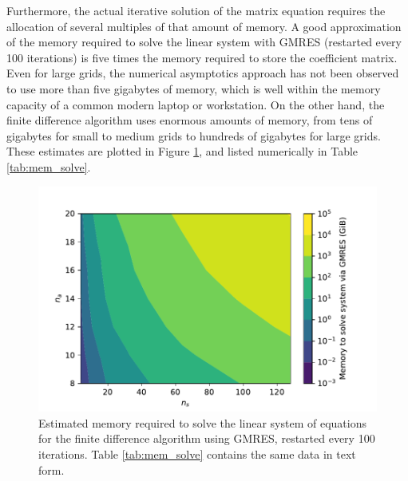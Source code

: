 \documentclass[ms,cpyr,lof,lot]{uathesis}
\providecommand{\DIFaddbeginFL}{} %
\providecommand{\DIFaddendFL}{} %
\providecommand{\DIFdelbeginFL}{} %
\providecommand{\DIFdelendFL}{} %
\newcommand{\DIFscaledelfig}{0.5}
\newlength{\DIFdelgraphicswidth} %
\newlength{\DIFdelgraphicsheight} %
\newcommand{\DIFaddincludegraphics}[2][]{{\color{blue}\fbox{\DIFOincludegraphics[#1]{#2}}}} %
\newcommand{\DIFdelincludegraphics}[2][]{%
\sbox{\DIFdelgraphicsbox}{\DIFOincludegraphics[#1]{#2}}%
\settoboxwidth{\DIFdelgraphicswidth}{\DIFdelgraphicsbox} %
\settoboxtotalheight{\DIFdelgraphicsheight}{\DIFdelgraphicsbox} %
\scalebox{\DIFscaledelfig}{%
\parbox[b]{\DIFdelgraphicswidth}{\usebox{\DIFdelgraphicsbox}\\[-\baselineskip] \rule{\DIFdelgraphicswidth}{0em}}\llap{\resizebox{\DIFdelgraphicswidth}{\DIFdelgraphicsheight}{%
\setlength{\unitlength}{\DIFdelgraphicswidth}%
\begin{picture}(1,1)%
\thicklines\linethickness{2pt} %
{\color[rgb]{1,0,0}\put(0,0){\framebox(1,1){}}}%
{\color[rgb]{1,0,0}\put(0,0){\line( 1,1){1}}}%
{\color[rgb]{1,0,0}\put(0,1){\line(1,-1){1}}}%
\end{picture}%
}\hspace*{3pt}}} %
} %
\DeclareRobustCommand{\DIFaddbeginFL}{\DIFOaddbeginFL \let\includegraphics\DIFaddincludegraphics} %
\DeclareRobustCommand{\DIFaddendFL}{\DIFOaddendFL \let\includegraphics\DIFOincludegraphics} %
\DeclareRobustCommand{\DIFdelbeginFL}{\DIFOdelbeginFL \let\includegraphics\DIFdelincludegraphics} %
\DeclareRobustCommand{\DIFdelendFL}{\DIFOaddendFL \let\includegraphics\DIFOincludegraphics} %
\begin{document}
Furthermore, the actual iterative solution of the matrix equation requires the allocation of several multiples of that amount of memory.
A good approximation of the memory required to solve the linear system with GMRES (restarted every 100 iterations) is five times the memory required to store the coefficient matrix.
Even for large grids, the numerical asymptotics approach has not been observed to use more than five gigabytes of memory, which is well within the memory capacity of a common modern laptop or workstation.
On the other hand, the finite difference algorithm uses enormous amounts of memory, from tens of gigabytes for small to medium grids to hundreds of gigabytes for large grids.
These estimates are plotted in Figure \ref{fig:mem_solve}, and listed numerically in Table \ref{tab:mem_solve}.
\begin{figure}[H]
  \centering
  \DIFdelbeginFL %
\DIFdelendFL \DIFaddbeginFL \includegraphics[width=6in]{memory_solve}
  \DIFaddendFL \caption{Estimated memory required to solve the linear system of equations for the finite difference algorithm using GMRES, restarted every 100 iterations. Table \ref{tab:mem_solve} contains the same data in text form.}
  \label{fig:mem_solve}
\end{figure}
\end{document}
